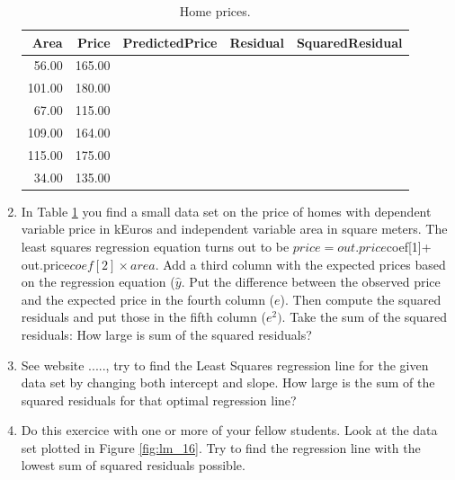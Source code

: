 \documentclass[]{report}\usepackage[]{graphicx}\usepackage[]{color}
\newenvironment{knitrout}{}{} %
\begin{document}
\begin{enumerate}



\begin{table}[ht]
\centering
\caption{Home prices.} 
\label{tab:lm_15}
\begin{tabular}{rrlll}
  \hline
Area & Price & PredictedPrice & Residual & SquaredResidual \\ 
  \hline
56.00 & 165.00 &   &   &   \\ 
  101.00 & 180.00 &   &   &   \\ 
  67.00 & 115.00 &   &   &   \\ 
  109.00 & 164.00 &   &   &   \\ 
  115.00 & 175.00 &   &   &   \\ 
  34.00 & 135.00 &   &   &   \\ 
   \hline
\end{tabular}
\end{table}


\item In Table \ref{tab:lm_15} you find a small data set on the price of homes with dependent variable price in kEuros and independent variable area in square meters. The least squares regression equation turns out to be $price = out.price$coef[1]+ out.price$coef[2]\times area$. Add a third column with the expected prices based on the regression equation ($\hat{y}$. Put the difference between the observed price and the expected price in the fourth column ($e$). Then compute the squared residuals and put those in the fifth column ($e^2)$. Take the sum of the squared residuals: How large is sum of the squared residuals?


\item See website ....., try to find the Least Squares regression line for the given data set by changing both intercept and slope. How large is the sum of the squared residuals for that optimal regression line?


\item Do this exercice with one or more of your fellow students. Look at the data set plotted in Figure \ref{fig:lm_16}. Try to find the regression line with the lowest sum of squared residuals possible.

\begin{knitrout}
\color{fgcolor}\begin{figure}


\end{figure}
\end{knitrout}
\end{enumerate}
\end{document}
